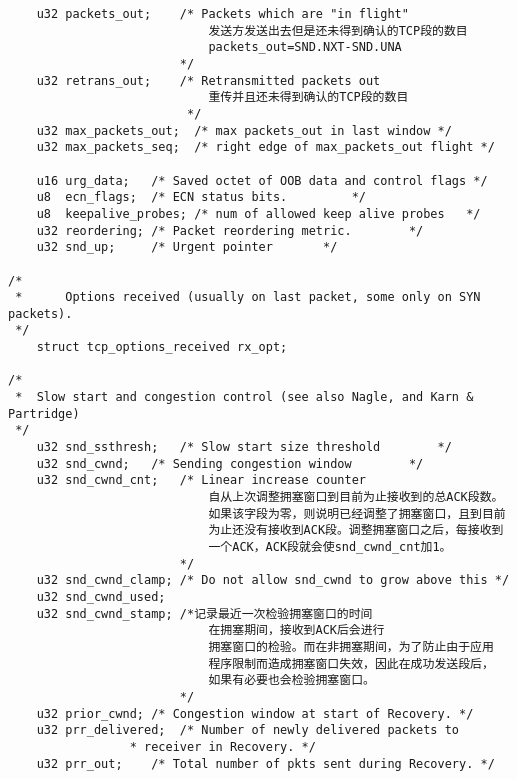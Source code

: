 \begin{verbatim}
    u32 packets_out;    /* Packets which are "in flight"    
                            发送方发送出去但是还未得到确认的TCP段的数目
                            packets_out=SND.NXT-SND.UNA             
                        */
    u32 retrans_out;    /* Retransmitted packets out       
                            重传并且还未得到确认的TCP段的数目
                         */
    u32 max_packets_out;  /* max packets_out in last window */
    u32 max_packets_seq;  /* right edge of max_packets_out flight */

    u16 urg_data;   /* Saved octet of OOB data and control flags */
    u8  ecn_flags;  /* ECN status bits.         */
    u8  keepalive_probes; /* num of allowed keep alive probes   */
    u32 reordering; /* Packet reordering metric.        */
    u32 snd_up;     /* Urgent pointer       */

/*
 *      Options received (usually on last packet, some only on SYN packets).
 */
    struct tcp_options_received rx_opt;

/*
 *  Slow start and congestion control (see also Nagle, and Karn & Partridge)
 */
    u32 snd_ssthresh;   /* Slow start size threshold        */
    u32 snd_cwnd;   /* Sending congestion window        */
    u32 snd_cwnd_cnt;   /* Linear increase counter      
                            自从上次调整拥塞窗口到目前为止接收到的总ACK段数。
                            如果该字段为零，则说明已经调整了拥塞窗口，且到目前
                            为止还没有接收到ACK段。调整拥塞窗口之后，每接收到
                            一个ACK，ACK段就会使snd_cwnd_cnt加1。
                        */
    u32 snd_cwnd_clamp; /* Do not allow snd_cwnd to grow above this */
    u32 snd_cwnd_used;
    u32 snd_cwnd_stamp; /*记录最近一次检验拥塞窗口的时间
                            在拥塞期间，接收到ACK后会进行
                            拥塞窗口的检验。而在非拥塞期间，为了防止由于应用
                            程序限制而造成拥塞窗口失效，因此在成功发送段后，
                            如果有必要也会检验拥塞窗口。
                        */
    u32 prior_cwnd; /* Congestion window at start of Recovery. */
    u32 prr_delivered;  /* Number of newly delivered packets to
                 * receiver in Recovery. */
    u32 prr_out;    /* Total number of pkts sent during Recovery. */


\end{verbatim}
